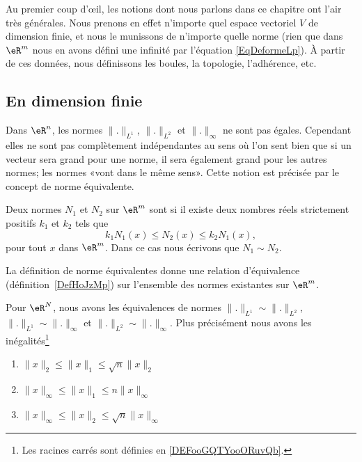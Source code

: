 Au premier coup d'œil, les notions dont nous parlons dans ce chapitre ont l'air très générales. Nous prenons en effet n'importe quel espace vectoriel $V$ de dimension finie, et nous le munissons de n'importe quelle norme (rien que dans $\eR^m$ nous en avons défini une infinité par l'équation \eqref{EqDeformeLp}). À partir de ces données, nous définissons les boules, la topologie, l'adhérence, etc.

\subsection{En dimension finie}

Dans $\eR^n$, les normes $\| . \|_{L^1}$, $\| . \|_{L^2}$ et $\| . \|_{\infty}$ ne sont pas égales. Cependant elles ne sont pas complètement indépendantes au sens où l'on sent bien que si un vecteur sera grand pour une norme, il sera également grand pour les autres normes; les normes «vont dans le même sens». Cette notion est précisée par le concept de norme équivalente.

\begin{definition}		\label{DefEquivNorm}
    Deux normes $N_1$ et $N_2$ sur $\eR^m$ sont  si il existe deux nombres réels strictement positifs $k_1$ et $k_2$ tels que
	\begin{equation}
		k_1N_1(x)\leq N_2(x)\leq k_2 N_1(x),
	\end{equation}
	pour tout $x$ dans $\eR^m$. Dans ce cas nous écrivons que $N_1\sim N_2$.
\end{definition}

\begin{lemma}       \label{LEMooHAITooWdtLAN}
    La définition de norme équivalentes donne une relation d'équivalence (définition~\ref{DefHoJzMp}) sur l'ensemble des normes existantes sur $\eR^m$.
\end{lemma}

\begin{proposition} \label{PropLJEJooMOWPNi}
    Pour \( \eR^N\), nous avons les équivalences de normes $\| . \|_{L^1}\sim\| . \|_{L^2}$, $\| . \|_{L^1}\sim\| . \|_{\infty}$ et $\| . \|_{L^2}\sim\| . \|_{\infty}$. Plus précisément nous avons les inégalités\footnote{Les racines carrés sont définies en \ref{DEFooGQTYooORuvQb}.}
    \begin{enumerate}
        \item\label{ItemABSGooQODmLNi}
           $ \| x \|_2\leq \| x \|_1\leq\sqrt{n}\| x \|_2$
        \item\label{ItemABSGooQODmLNii}
            $\| x \|_{\infty}\leq \| x \|_1\leq n \| x \|_{\infty}$
        \item\label{ItemABSGooQODmLNiii}
            $\| x \|_{\infty}\leq \| x \|_2\leq \sqrt{n}\| x \|_{\infty}$
    \end{enumerate}
\end{proposition}


